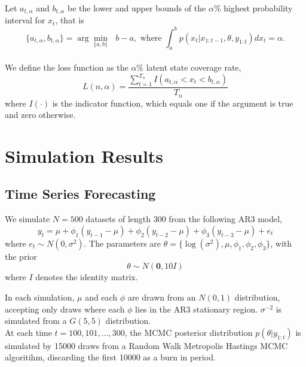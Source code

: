 \documentclass[12pt,a4paper]{article}\usepackage[]{graphicx}\usepackage[]{color}
\begin{document}
Let $a_{t, \alpha}$ and $b_{t, \alpha}$ be the lower and upper bounds of the $\alpha\%$ highest probability interval for $x_t$, that is
\begin{equation}
\label{HPI}
\{a_{t, \alpha}, b_{t, \alpha}\} = \arg \underset{\{a, b\}}{\min}\mbox{ } b - a, \mbox{ where } \int_a^b p(x_t | x_{1:t-1}, \theta, y_{1:t})dx_t = \alpha.
\end{equation}
\\

We define the loss function as the $\alpha\%$ latent state coverage rate, 
\begin{equation}
\label{coverage}
L(n, \alpha) = \frac{\sum_{t=1}^{T_n} I(a_{t, \alpha} < x_t < b_{t, \alpha})}{T_n}
\end{equation}
where $I(\cdot)$ is the indicator function, which equals one if the argument is true and zero otherwise.

\section{Simulation Results}

\subsection{Time Series Forecasting}

We simulate $N = 500$ datasets of length $300$ from the following AR3 model,
\begin{equation}
\label{AR3}
y_t = \mu + \phi_1 (y_{t-1} - \mu) + \phi_2 (y_{t-2} - \mu) + \phi_3 (y_{t-3} - \mu) + e_t
\end{equation}
where $e_t \sim N(0, \sigma^2)$. 
The parameters are $\theta = \{\log(\sigma^2), \mu, \phi_1, \phi_2, \phi_3 \}$, with the prior
\begin{equation}
\label{prior}
\theta \sim N(\boldsymbol{0}, 10 I)
\end{equation}
where $I$ denotes the identity matrix.

In each simulation, $\mu$ and each $\phi$ are drawn from an $N(0, 1)$ distribution, accepting only draws where each $\phi$ lies in the AR3 stationary region. $\sigma^{-2}$ is simulated from a $G(5, 5)$ distribution.
\\

At each time $t = 100, 101, \dots, 300$, the MCMC posterior distribution $p(\theta | y_{1:t})$ is simulated by 15000 draws from a Random Walk Metropolis Hastings MCMC algoritihm, discarding the first 10000 as a burn in period.
\\
\end{document}
